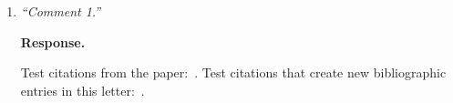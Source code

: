 \documentclass[11pt]{article}
\begin{document}
\begin{enumerate}[label=R1.\arabic*] %

    \item {\it ``Comment 1.''}

          {\bf Response.}
          \begin{bullets}
              Test citations from the paper:~\cite{P-kay1}.
              Test citations that create new bibliographic entries in this letter:~\cite{wilson2009regularization,wilson2010tomography}.

          \end{bullets}

          \begin{bullets}

              \begin{bullets}

                  \begin{bullets}

                      \begin{bullets}

                          \begin{bullets}

                              \begin{bullets}

                                  \begin{bullets}

                                      \begin{bullets}

                                          \begin{bullets}
                                          \end{bullets}

                                      \end{bullets}

                                  \end{bullets}


\end{bullets}
\end{bullets}
\end{bullets}
\end{bullets}
\end{bullets}
\end{bullets}
\end{enumerate}
\end{document}
